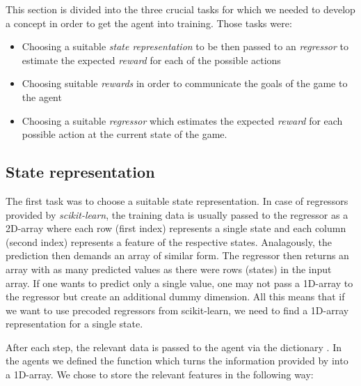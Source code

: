 This section is divided into the three crucial tasks for which we needed to develop a concept in order to get the agent into training. Those tasks were:

\begin{itemize}
	\item Choosing a suitable \textit{state representation} to be then passed to an \textit{regressor} to estimate the expected \textit{reward} for each of the possible actions
	\item Choosing suitable \textit{rewards} in order to communicate the goals of the game to the agent
	\item Choosing a suitable \textit{regressor} which estimates the expected \textit{reward} for each possible action at the current state of the game.
\end{itemize}

	\subsection{State representation}
	The first task was to choose a suitable state representation. In case of regressors provided by \textit{scikit-learn}, the training data is usually passed to the regressor as a 2D-array where each row (first index) represents a single state and each column (second index) represents a feature of the respective states. Analagously, the prediction then demands an array of similar form. The regressor then returns an array with as many predicted values as there were rows (states) in the input array. If one wants to predict only a single value, one may not pass a 1D-array to the regressor but create an additional dummy dimension. All this means that if we want to use precoded regressors from scikit-learn, we need to find a 1D-array representation for a single state. \par
	
	After each step, the relevant data is passed to the agent via the dictionary . In the agents  we defined the function  which turns the information provided by  into a 1D-array. We chose to store the relevant features in the following way:
	
